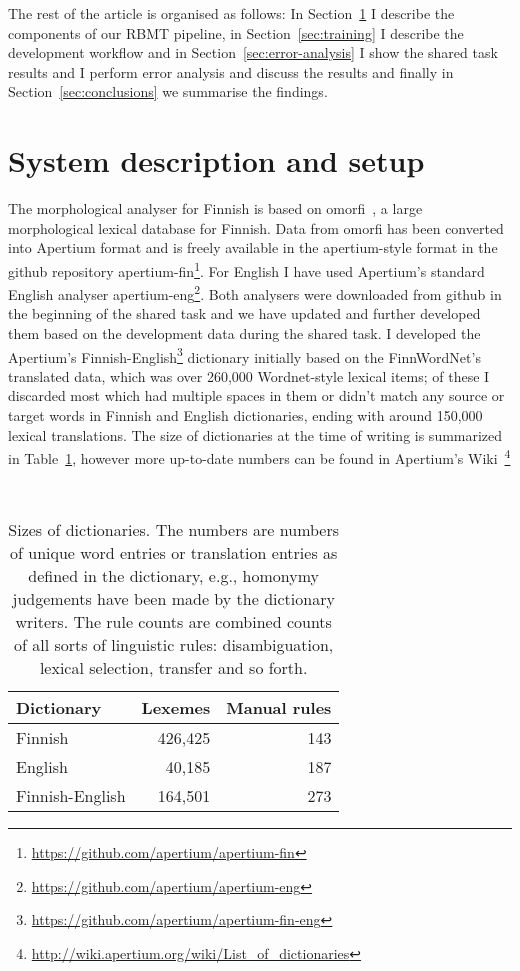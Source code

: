 \documentclass[11pt,a4paper]{article}
\begin{document}
The rest of the article is organised as follows: In Section~\ref{sec:data}
I describe the components of our RBMT pipeline, in Section~\ref{sec:training}
I describe the development workflow and in Section~\ref{sec:error-analysis} I show
the shared task results and I perform error
analysis and discuss the results and finally in Section~\ref{sec:conclusions} we
summarise the findings.

\section{System description and setup}
\label{sec:data}

The morphological analyser for Finnish is based on omorfi~\cite{omorfi}, a large
morphological lexical database for Finnish. Data from omorfi has been converted
into Apertium format and is freely available in the apertium-style format in the
github repository
apertium-fin\footnote{\url{https://github.com/apertium/apertium-fin}}. For
English I have used Apertium's standard English analyser
apertium-eng\footnote{\url{https://github.com/apertium/apertium-eng}}. Both
analysers were downloaded from github in the beginning of the shared task and we
have updated and further developed them based on the development data during the
shared task. I developed the  Apertium's Finnish-English\footnote{\url{https://github.com/apertium/apertium-fin-eng}} dictionary initially
based on the FinnWordNet's translated data, which was over 260,000 Wordnet-style
lexical items; of these I discarded most which had multiple spaces in them or
didn't match any source or target words in Finnish and English dictionaries,
ending with around 150,000 lexical translations.  The size of dictionaries at
the time of writing is summarized in Table~\ref{table:dictionaries}, however
more up-to-date numbers can be found in Apertium's
Wiki~\footnote{\url{http://wiki.apertium.org/wiki/List_of_dictionaries}}

\begin{table}
    \begin{center}
    \begin{tabular}{lrr}
        \toprule
        Dictionary & Lexemes & Manual rules \\
        \midrule
        Finnish & 426,425 & 143 \\
        English & 40,185 & 187 \\
        Finnish-English & 164,501 & 273 \\
        \bottomrule
    \end{tabular}
    \caption{Sizes of dictionaries. The numbers are numbers of unique word
    entries or translation entries as defined in the dictionary, e.g., homonymy
    judgements have been made by the dictionary
    writers. The rule counts are combined counts of all sorts of linguistic
    rules: disambiguation, lexical selection, transfer and so
    forth.\label{table:dictionaries}}
    \end{center}
\end{table}
\end{document}
